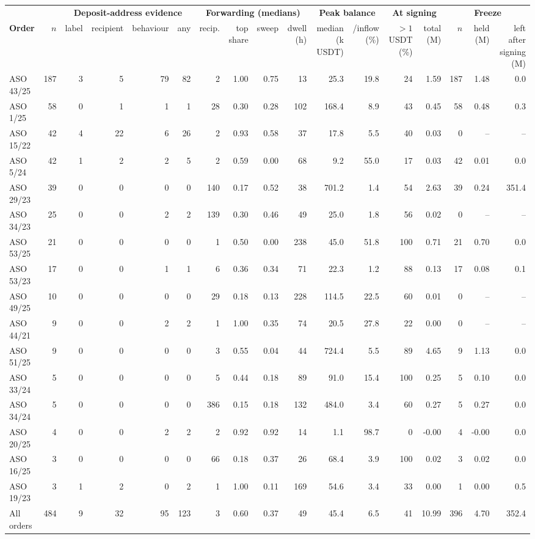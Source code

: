 \begin{tabular}{lrrrrrrrrrrrrrrrr}
\toprule
 & & \multicolumn{4}{c}{\textbf{Deposit-address evidence}} & \multicolumn{4}{c}{\textbf{Forwarding (medians)}} & \multicolumn{2}{c}{\textbf{Peak balance}} & \multicolumn{2}{c}{\textbf{At signing}} & \multicolumn{3}{c}{\textbf{Freeze}} \\
\cmidrule(lr){3-6}\cmidrule(lr){7-10}\cmidrule(lr){11-12}\cmidrule(lr){13-14}\cmidrule(lr){15-17}
\textbf{Order} & $n$ & label & recipient & behaviour & any & recip. & top share & sweep & dwell (h) & median (k USDT) & /inflow (\%) & $>1$ USDT (\%) & total (M) & $n$ & held (M) & left after signing (M) \\
\midrule
ASO 43/25 & 187 & 3 & 5 & 79 & 82 & 2 & 1.00 & 0.75 & 13 & 25.3 & 19.8 & 24 & 1.59 & 187 & 1.48 & 0.0 \\
ASO 1/25 & 58 & 0 & 1 & 1 & 1 & 28 & 0.30 & 0.28 & 102 & 168.4 & 8.9 & 43 & 0.45 & 58 & 0.48 & 0.3 \\
ASO 15/22 & 42 & 4 & 22 & 6 & 26 & 2 & 0.93 & 0.58 & 37 & 17.8 & 5.5 & 40 & 0.03 & 0 & -- & -- \\
ASO 5/24 & 42 & 1 & 2 & 2 & 5 & 2 & 0.59 & 0.00 & 68 & 9.2 & 55.0 & 17 & 0.03 & 42 & 0.01 & 0.0 \\
ASO 29/23 & 39 & 0 & 0 & 0 & 0 & 140 & 0.17 & 0.52 & 38 & 701.2 & 1.4 & 54 & 2.63 & 39 & 0.24 & 351.4 \\
ASO 34/23 & 25 & 0 & 0 & 2 & 2 & 139 & 0.30 & 0.46 & 49 & 25.0 & 1.8 & 56 & 0.02 & 0 & -- & -- \\
ASO 53/25 & 21 & 0 & 0 & 0 & 0 & 1 & 0.50 & 0.00 & 238 & 45.0 & 51.8 & 100 & 0.71 & 21 & 0.70 & 0.0 \\
ASO 53/23 & 17 & 0 & 0 & 1 & 1 & 6 & 0.36 & 0.34 & 71 & 22.3 & 1.2 & 88 & 0.13 & 17 & 0.08 & 0.1 \\
ASO 49/25 & 10 & 0 & 0 & 0 & 0 & 29 & 0.18 & 0.13 & 228 & 114.5 & 22.5 & 60 & 0.01 & 0 & -- & -- \\
ASO 44/21 & 9 & 0 & 0 & 2 & 2 & 1 & 1.00 & 0.35 & 74 & 20.5 & 27.8 & 22 & 0.00 & 0 & -- & -- \\
ASO 51/25 & 9 & 0 & 0 & 0 & 0 & 3 & 0.55 & 0.04 & 44 & 724.4 & 5.5 & 89 & 4.65 & 9 & 1.13 & 0.0 \\
ASO 33/24 & 5 & 0 & 0 & 0 & 0 & 5 & 0.44 & 0.18 & 89 & 91.0 & 15.4 & 100 & 0.25 & 5 & 0.10 & 0.0 \\
ASO 34/24 & 5 & 0 & 0 & 0 & 0 & 386 & 0.15 & 0.18 & 132 & 484.0 & 3.4 & 60 & 0.27 & 5 & 0.27 & 0.0 \\
ASO 20/25 & 4 & 0 & 0 & 2 & 2 & 2 & 0.92 & 0.92 & 14 & 1.1 & 98.7 & 0 & -0.00 & 4 & -0.00 & 0.0 \\
ASO 16/25 & 3 & 0 & 0 & 0 & 0 & 66 & 0.18 & 0.37 & 26 & 68.4 & 3.9 & 100 & 0.02 & 3 & 0.02 & 0.0 \\
ASO 19/23 & 3 & 1 & 2 & 0 & 2 & 1 & 1.00 & 0.11 & 169 & 54.6 & 3.4 & 33 & 0.00 & 1 & 0.00 & 0.5 \\
\midrule
All orders & 484 & 9 & 32 & 95 & 123 & 3 & 0.60 & 0.37 & 49 & 45.4 & 6.5 & 41 & 10.99 & 396 & 4.70 & 352.4 \\
\bottomrule
\end{tabular}
